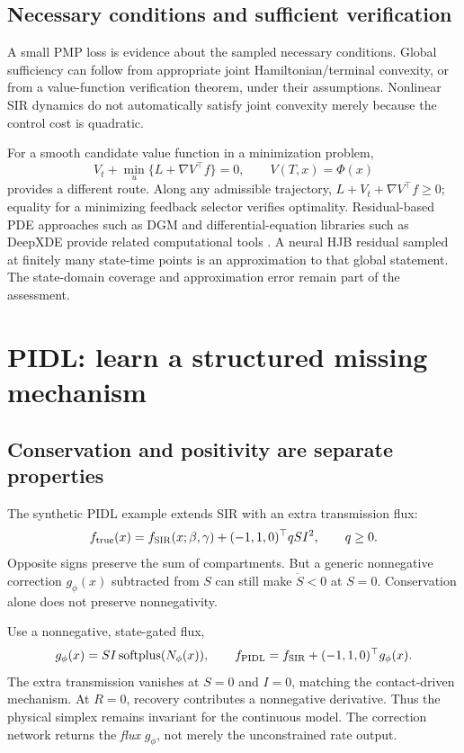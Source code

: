 \documentclass[11pt,a4paper]{article}
\theoremstyle{definition}
\theoremstyle{remark}
\begin{document}
\subsection{Necessary conditions and sufficient verification}
A small PMP loss is evidence about the sampled necessary conditions. Global sufficiency can follow from appropriate joint Hamiltonian/terminal convexity, or from a value-function verification theorem, under their assumptions. Nonlinear SIR dynamics do not automatically satisfy joint convexity merely because the control cost is quadratic.

For a smooth candidate value function in a minimization problem,
\begin{equation}
V_t+\min_u\{L+\nabla V^\top f\}=0,\qquad V(T,x)=\Phi(x)
\end{equation}
provides a different route. Along any admissible trajectory, $L+V_t+\nabla V^\top f\ge0$; equality for a minimizing feedback selector verifies optimality. Residual-based PDE approaches such as DGM and differential-equation libraries such as DeepXDE provide related computational tools \cite{dgm,deepxde}. A neural HJB residual sampled at finitely many state-time points is an approximation to that global statement. The state-domain coverage and approximation error remain part of the assessment.

\section{PIDL: learn a structured missing mechanism}
\subsection{Conservation and positivity are separate properties}
The synthetic PIDL example extends SIR with an extra transmission flux:
\begin{equation}
f_{\rm true}(x)=f_{\rm SIR}(x;\beta,\gamma)
+(-1,1,0)^\top qSI^2,\qquad q\ge0.
\end{equation}
Opposite signs preserve the sum of compartments. But a generic nonnegative correction $g_\phi(x)$ subtracted from $S$ can still make $\dot S<0$ at $S=0$. Conservation alone does not preserve nonnegativity.

Use a nonnegative, state-gated flux,
\begin{equation}
g_\phi(x)=SI\operatorname{softplus}(N_\phi(x)),\qquad
f_{\rm PIDL}=f_{\rm SIR}+(-1,1,0)^\top g_\phi(x).
\label{eq:pidl-flux}
\end{equation}
The extra transmission vanishes at $S=0$ and $I=0$, matching the contact-driven mechanism. At $R=0$, recovery contributes a nonnegative derivative. Thus the physical simplex remains invariant for the continuous model. The correction network returns the \emph{flux} $g_\phi$, not merely the unconstrained rate output.
\end{document}
